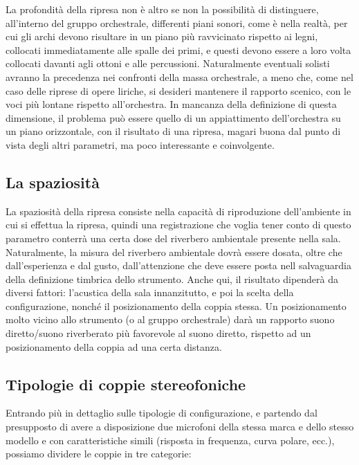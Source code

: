 La profondità della ripresa non è altro se non la possibilità di distinguere,
all’interno del gruppo orchestrale, differenti piani sonori, come è nella realtà,
per cui gli archi devono risultare in un piano più ravvicinato rispetto ai legni,
collocati immediatamente alle spalle dei primi, e questi devono essere a loro
volta collocati davanti agli ottoni e alle percussioni. Naturalmente eventuali
solisti avranno la precedenza nei confronti della massa orchestrale, a meno che,
come nel caso delle riprese di opere liriche, si desideri mantenere il rapporto
scenico, con le voci più lontane rispetto all’orchestra. In mancanza della
definizione di questa dimensione, il problema può essere quello di un appiattimento
dell’orchestra su un piano orizzontale, con il risultato di una ripresa, magari
buona dal punto di vista degli altri parametri, ma poco interessante e coinvolgente.

\subsection{La spaziosità}

La spaziosità della ripresa consiste nella capacità di riproduzione dell’ambiente
in cui si effettua la ripresa, quindi una registrazione che voglia tener conto
di questo parametro conterrà una certa dose del riverbero ambientale presente
nella sala. Naturalmente, la misura del riverbero ambientale dovrà essere dosata,
oltre che dall’esperienza e dal gusto, dall’attenzione che deve essere posta nell
salvaguardia della definizione timbrica dello strumento. Anche qui, il risultato
dipenderà da diversi fattori: l’acustica della sala innanzitutto, e poi la scelta
della configurazione, nonché il posizionamento della coppia stessa. Un
posizionamento molto vicino allo strumento (o al gruppo orchestrale) darà un
rapporto suono diretto/suono riverberato più favorevole al suono diretto, rispetto
ad un posizionamento della coppia ad una certa distanza.

\subsection{Tipologie di coppie stereofoniche}

Entrando più in dettaglio sulle tipologie di configurazione, e partendo dal
presupposto di avere a disposizione due microfoni della stessa marca e dello stesso
modello e con caratteristiche simili (risposta in frequenza, curva polare, ecc.),
possiamo dividere le coppie in tre categorie:

